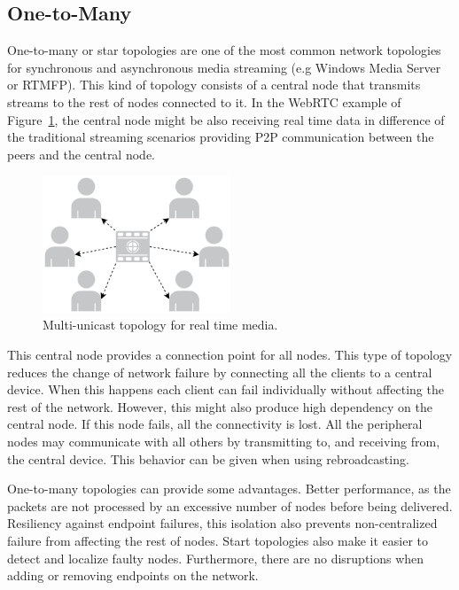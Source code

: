 \subsection{One-to-Many}

One-to-many or star topologies are one of the most common network topologies for synchronous and asynchronous media streaming (e.g Windows Media Server or RTMFP). This kind of topology consists of a central node that transmits streams to the rest of nodes connected to it. In the WebRTC example of Figure~\ref{fig:starExample}, the central node might be also receiving real time data in difference of the traditional streaming scenarios providing P2P communication between the peers and the central node.

 \begin{figure}[h]
  \centering
    \includegraphics[width=0.5\textwidth]{./figures/star.pdf}
      \caption[Multi-unicast topology for real time media]{Multi-unicast topology for real time media.}
	\label{fig:starExample}
\end{figure}

This central node provides a connection point for all nodes. This type of topology reduces the change of network failure by connecting all the clients to a central device. When this happens each client can fail individually without affecting the rest of the network. However, this might also produce high dependency on the central node. If this node fails, all the connectivity is lost. All the peripheral nodes may communicate with all others by transmitting to, and receiving from, the central device. This behavior can be given when using rebroadcasting.

One-to-many topologies can provide some advantages. Better performance, as the packets are not processed by an excessive number of nodes before being delivered. Resiliency against endpoint failures, this isolation also prevents non-centralized failure from affecting the rest of nodes. Start topologies also make it easier to detect and localize faulty nodes. Furthermore, there are no disruptions when adding or removing endpoints on the network.

